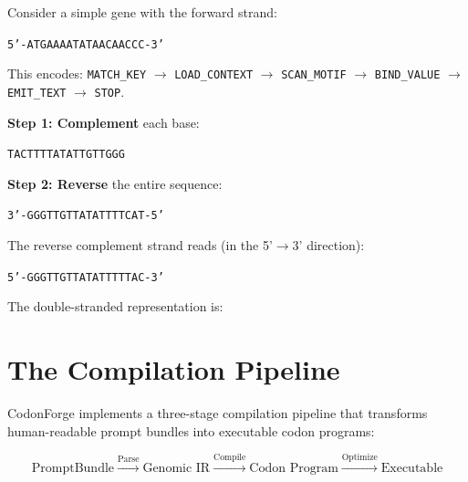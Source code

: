 \begin{example}
\label{ex:strand-construction}
Consider a simple gene with the forward strand:
\begin{center}
\texttt{5'-ATG\;AAA\;ATA\;TAA\;CAA\;CCC-3'}
\end{center}
This encodes: \texttt{MATCH\_KEY} $\to$ \texttt{LOAD\_CONTEXT} $\to$ \texttt{SCAN\_MOTIF} $\to$ \texttt{BIND\_VALUE} $\to$ \texttt{EMIT\_TEXT} $\to$ \texttt{STOP}.

\medskip
\noindent\textbf{Step 1: Complement} each base:
\begin{center}
\texttt{TAC\;TTT\;TAT\;ATT\;GTT\;GGG}
\end{center}

\noindent\textbf{Step 2: Reverse} the entire sequence:
\begin{center}
\texttt{3'-GGG\;TTG\;TTA\;TAT\;TTT\;CAT-5'}
\end{center}

The reverse complement strand reads (in the 5'$\to$3' direction):
\begin{center}
\texttt{5'-GGG\;TTG\;TTA\;TAT\;TTT\;TAC-3'}
\end{center}

The double-stranded representation is:
\begin{center}
\end{center}
\end{example}


\section{The Compilation Pipeline}
\label{sec:compilation-pipeline}

CodonForge implements a three-stage compilation pipeline that transforms human-readable prompt bundles into executable codon programs:

\begin{equation}
\text{PromptBundle} \xrightarrow{\text{Parse}} \text{Genomic IR} \xrightarrow{\text{Compile}} \text{Codon Program} \xrightarrow{\text{Optimize}} \text{Executable}
\end{equation}

